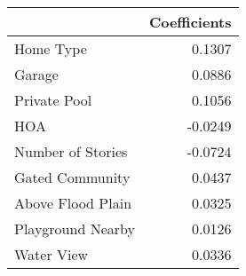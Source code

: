 \begin{table}[H]
\centering
\begin{tabular}{lr}
\toprule
 & Coefficients \\
\midrule
Home Type & 0.1307 \\
Garage & 0.0886 \\
Private Pool & 0.1056 \\
HOA & -0.0249 \\
Number of Stories & -0.0724 \\
Gated Community & 0.0437 \\
Above Flood Plain & 0.0325 \\
Playground Nearby & 0.0126 \\
Water View & 0.0336 \\
\bottomrule
\end{tabular}
\end{table}
